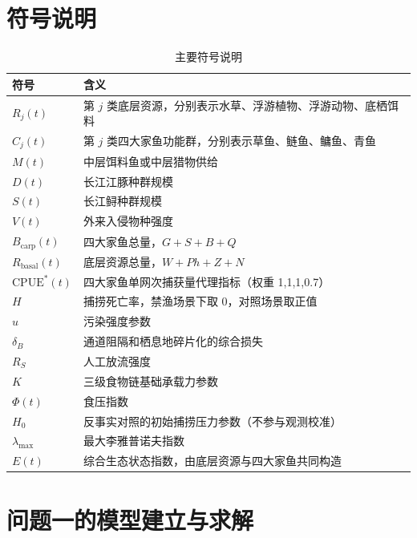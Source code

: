 \documentclass{MMCStyle}
\begin{document}
\section{符号说明}
\begin{table}[htbp]
\centering
\caption{主要符号说明}
\begin{tabularx}{0.95\textwidth}{>{\raggedright\arraybackslash}p{2.2cm}X}
\toprule
符号 & 含义 \\
\midrule
$R_j(t)$ & 第 $j$ 类底层资源，分别表示水草、浮游植物、浮游动物、底栖饵料 \\
$C_j(t)$ & 第 $j$ 类四大家鱼功能群，分别表示草鱼、鲢鱼、鳙鱼、青鱼 \\
$M(t)$ & 中层饵料鱼或中层猎物供给 \\
$D(t)$ & 长江江豚种群规模 \\
$S(t)$ & 长江鲟种群规模 \\
$V(t)$ & 外来入侵物种强度 \\
$B_{\text{carp}}(t)$ & 四大家鱼总量，$G+S+B+Q$ \\
$R_{\text{basal}}(t)$ & 底层资源总量，$W+Ph+Z+N$ \\
$\mathrm{CPUE}^*(t)$ & 四大家鱼单网次捕获量代理指标（权重 1,1,1,0.7） \\
$H$ & 捕捞死亡率，禁渔场景下取 0，对照场景取正值 \\
$u$ & 污染强度参数 \\
$\delta_B$ & 通道阻隔和栖息地碎片化的综合损失 \\
$R_S$ & 人工放流强度 \\
$K$ & 三级食物链基础承载力参数 \\
$\Phi(t)$ & 食压指数 \\
$H_0$ & 反事实对照的初始捕捞压力参数（不参与观测校准） \\
$\lambda_{\max}$ & 最大李雅普诺夫指数 \\
$E(t)$ & 综合生态状态指数，由底层资源与四大家鱼共同构造 \\
\bottomrule
\end{tabularx}
\end{table}

\section{问题一的模型建立与求解}
\end{document}
